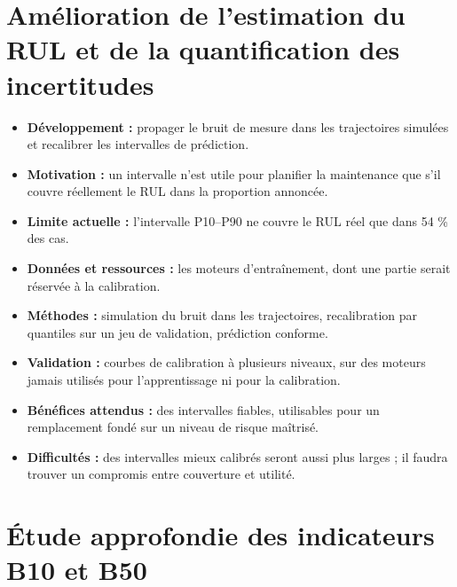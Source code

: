 \section{Amélioration de l'estimation du RUL et de la quantification des incertitudes}\label{sec:p-incertitude}

\begin{itemize}
\item \textbf{Développement :} propager le bruit de mesure dans les trajectoires simulées et recalibrer les intervalles de prédiction.
\item \textbf{Motivation :} un intervalle n'est utile pour planifier la maintenance que s'il couvre réellement le RUL dans la proportion annoncée.
\item \textbf{Limite actuelle :} l'intervalle P10–P90 ne couvre le RUL réel que dans 54 \% des cas.
\item \textbf{Données et ressources :} les moteurs d'entraînement, dont une partie serait réservée à la calibration.
\item \textbf{Méthodes :} simulation du bruit dans les trajectoires, recalibration par quantiles sur un jeu de validation, prédiction conforme.
\item \textbf{Validation :} courbes de calibration à plusieurs niveaux, sur des moteurs jamais utilisés pour l'apprentissage ni pour la calibration.
\item \textbf{Bénéfices attendus :} des intervalles fiables, utilisables pour un remplacement fondé sur un niveau de risque maîtrisé.
\item \textbf{Difficultés :} des intervalles mieux calibrés seront aussi plus larges ; il faudra trouver un compromis entre couverture et utilité.
\end{itemize}

\section{Étude approfondie des indicateurs B10 et B50}\label{sec:p-bp}

